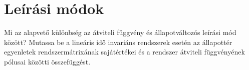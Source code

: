 \documentclass[../main.tex]{subfiles}
\begin{document}
\section{Leírási módok}

\begin{fulltheorem}
	Mi az alapvető különbség az átviteli függvény és állapotváltozós leírási mód
	között? Mutassa be a lineáris idő invariáns rendszerek esetén az állapottér
	egyenletek rendszermátrixának sajátértékei és a rendszer átviteli
	függvényének pólusai közötti összefüggést.
\end{fulltheorem}
\end{document}
